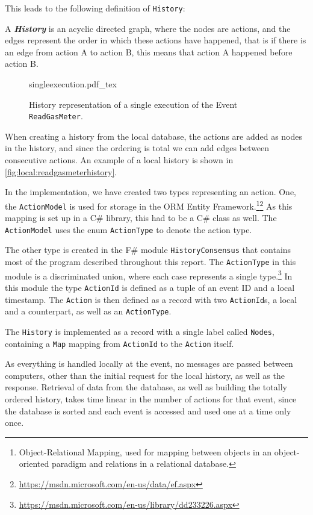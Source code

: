 	\newpar This leads to the following definition of \texttt{History}:
	
	\begin{definition}
		A \textit{\textbf{History}} is an acyclic directed graph, where the nodes are actions, and the edges represent the order in which these actions have happened, that is if there is an edge from action A to action B, this means that action A happened before action B.
	\end{definition}
	
	\begin{figure}
		\centering
		{singleexecution.pdf_tex}
		\caption{History representation of a single execution of the Event \texttt{ReadGasMeter}.}
		\label{fig:local:readgasmeterhistory}
	\end{figure}
	\newpar When creating a history from the local database, the actions are added as nodes in the history, and since the ordering is total we can add edges between consecutive actions. An example of a local history is shown in \autoref{fig:local:readgasmeterhistory}.
	
	\newpar In the implementation, we have created two types representing an action. One, the \texttt{ActionModel} is used for storage in the ORM Entity Framework.\footnote{Object-Relational Mapping, used for mapping between objects in an object-oriented paradigm and relations in a relational database.}\footnote{\url{https://msdn.microsoft.com/en-us/data/ef.aspx}} As this mapping is set up in a C\# library, this had to be a C\# class as well. The \texttt{ActionModel} uses the enum \texttt{ActionType} to denote the action type.
	
	The other type is created in the F\# module \texttt{HistoryConsensus} that contains most of the program described throughout this report. The \texttt{ActionType} in this module is a discriminated union, where each case represents a single type.\footnote{\url{https://msdn.microsoft.com/en-us/library/dd233226.aspx}}
	In this module the type \texttt{ActionId} is defined as a tuple of an event ID and a local timestamp. The \texttt{Action} is then defined as a record  with two \texttt{ActionId}s, a local and a counterpart, as well as an \texttt{ActionType}.
	
	The \texttt{History} is implemented as a record with a single label called \texttt{Nodes}, containing a \texttt{Map} mapping from \texttt{ActionId} to the \texttt{Action} itself.
	
	\newpar As everything is handled locally at the event, no messages are passed between computers, other than the initial request for the local history, as well as the response. Retrieval of data from the database, as well as building the totally ordered history, takes time linear in the number of actions for that event, since the database is sorted and each event is accessed and used one at a time only once.
	
